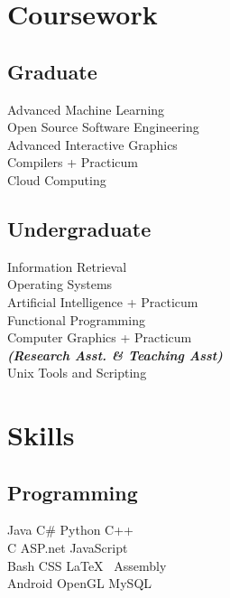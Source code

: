 \documentclass[]{deedy-resume-openfont}
\begin{document}
\begin{minipage}[t]{0.33\textwidth}

\section{Coursework}
\subsection{Graduate}
Advanced Machine Learning \\
Open Source Software Engineering \\
Advanced Interactive Graphics \\
Compilers + Practicum \\
Cloud Computing \\
\sectionsep

\subsection{Undergraduate}
Information Retrieval \\
Operating Systems \\
Artificial Intelligence + Practicum \\
Functional Programming \\
Computer Graphics + Practicum \\
{\footnotesize \textit{\textbf{(Research Asst. \& Teaching Asst) }}} \\
Unix Tools and Scripting \\
\sectionsep


\section{Skills}
\subsection{Programming}
Java \textbullet{} C\# \textbullet{} Python \textbullet{} C++ \\
C\textbullet{} ASP.net \textbullet{} JavaScript \\ 
Bash\textbullet{} CSS \textbullet{} \LaTeX\ \textbullet{} Assembly \\
Android \textbullet{} OpenGL \textbullet{} MySQL
\sectionsep

%
%

\end{minipage} 
\end{document}

